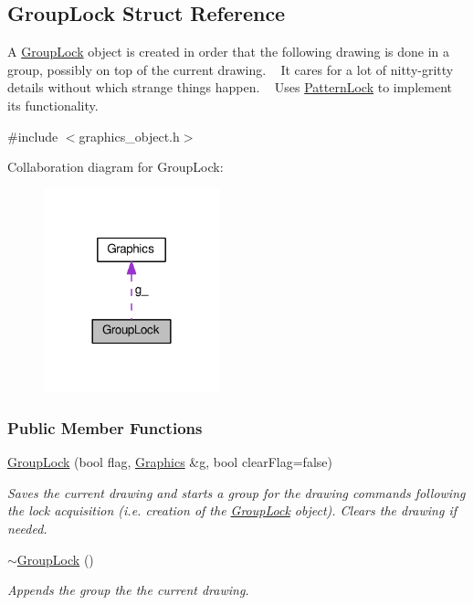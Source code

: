 \hypertarget{structGroupLock}{}\subsection{Group\+Lock Struct Reference}
\label{structGroupLock}


A \hyperlink{structGroupLock}{Group\+Lock} object is created in order that the following drawing is done in a group, possibly on top of the current drawing. ~\newline
It cares for a lot of nitty-\/gritty details without which strange things happen. ~\newline
Uses \hyperlink{structPatternLock}{Pattern\+Lock} to implement its functionality.  




{\ttfamily \#include $<$graphics\+\_\+object.\+h$>$}



Collaboration diagram for Group\+Lock\+:\nopagebreak
\begin{figure}[H]
\begin{center}
\leavevmode
\includegraphics[width=144pt]{structGroupLock__coll__graph}
\end{center}
\end{figure}
\subsubsection*{Public Member Functions}
\begin{DoxyCompactItemize}
\item 
\hyperlink{structGroupLock_a1cdc544eedd368d0c847eb7aabd91978}{Group\+Lock} (bool flag, \hyperlink{structGraphics}{Graphics} \&g, bool clear\+Flag=false)
\begin{DoxyCompactList}\small\item\em Saves the current drawing and starts a group for the drawing commands following the lock acquisition (i.\+e. creation of the \hyperlink{structGroupLock}{Group\+Lock} object). Clears the drawing if needed. \end{DoxyCompactList}\item 
\hyperlink{structGroupLock_a5d68d32a9ec1ee73156dabdcf9337fba}{$\sim$\+Group\+Lock} ()\hypertarget{structGroupLock_a5d68d32a9ec1ee73156dabdcf9337fba}{}\label{structGroupLock_a5d68d32a9ec1ee73156dabdcf9337fba}

\begin{DoxyCompactList}\small\item\em Appends the group the the current drawing. \end{DoxyCompactList}\end{DoxyCompactItemize}
